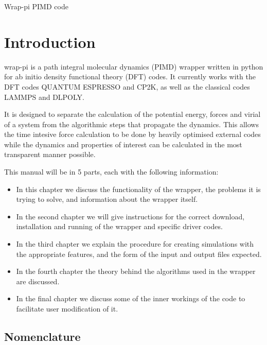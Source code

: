 \documentclass[12pt,fleqn]{report}
\begin{document}
\begin{titlepage}
\begin{center}

\vspace*{+5.5cm}

{\LARGE Wrap-pi PIMD code}
\end{center}
\end{titlepage}


\tableofcontents
\listoffigures

\newpage
{}

\chapter{Introduction}
wrap-pi is a path integral molecular dynamics (PIMD) wrapper written in python for ab initio density functional theory (DFT) codes. It currently works with the DFT codes QUANTUM ESPRESSO and CP2K, as well as the classical codes LAMMPS and DLPOLY.

It is designed to separate the calculation of the potential energy, forces and virial of a system from the algorithmic steps that propagate the dynamics. This allows the time intesive force calculation to be done by heavily optimised external codes while the dynamics and properties of interest can be calculated in the most transparent manner possible.

This manual will be in 5 parts, each with the following information:
\begin{itemize}
\item In this chapter we discuss the functionality of the wrapper, the problems it is trying to solve, and information about the wrapper itself.
\item In the second chapter we will give instructions for the correct download, installation and running of the wrapper and specific driver codes.
\item In the third chapter we explain the procedure for creating simulations with the appropriate features, and the form of the input and output files expected.
\item In the fourth chapter the theory behind the algorithms used in the wrapper are discussed.
\item In the final chapter we discuss some of the inner workings of the code to facilitate user modification of it.
\end{itemize}
\section{Nomenclature}
\end{document}
